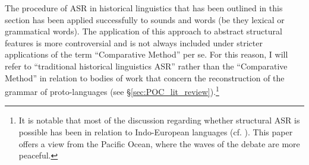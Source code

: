 \documentclass[12pt,letterpaper]{article}
\begin{document}
The procedure of ASR in historical linguistics that has been outlined in this section has been applied successfully to sounds and words (be they lexical or grammatical words). The application of this approach to abstract structural features is more controversial and is not always included under stricter applications of the term ``Comparative Method'' per se. For this reason, I will refer to ``traditional historical linguistics ASR'' rather than the ``Comparative Method'' in relation to bodies of work that concern the reconstruction of the grammar of proto-languages (see §\ref{sec:POC_lit_review}).\footnote{It is notable that most of the discussion regarding whether structural ASR is possible has been in relation to Indo-European languages (cf. \citealt{walkden_2013}). This paper offers a view from the Pacific Ocean, where the waves of the debate are more peaceful.}








\end{document}
